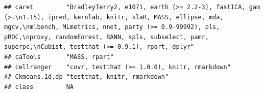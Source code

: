\documentclass[]{article}
\begin{document}
\begin{verbatim}
## caret         "BradleyTerry2, e1071, earth (>= 2.2-3), fastICA, gam (>=\n1.15), ipred, kernlab, knitr, klaR, MASS, ellipse, mda, mgcv,\nmlbench, MLmetrics, nnet, party (>= 0.9-99992), pls, pROC,\nproxy, randomForest, RANN, spls, subselect, pamr, superpc,\nCubist, testthat (>= 0.9.1), rpart, dplyr"                                                                                                                                                                                                                                                                                              
## caTools       "MASS, rpart"                                                                                                                                                                                                                                                                                                                                                                                                                                                                                                                                                                             
## cellranger    "covr, testthat (>= 1.0.0), knitr, rmarkdown"                                                                                                                                                                                                                                                                                                                                                                                                                                                                                                                                             
## Ckmeans.1d.dp "testthat, knitr, rmarkdown"                                                                                                                                                                                                                                                                                                                                                                                                                                                                                                                                                              
## class         NA                                                                                                                                                                                                                                                                                                                                                                                                                                                                                                                                                                                        

\end{verbatim}
\end{document}
